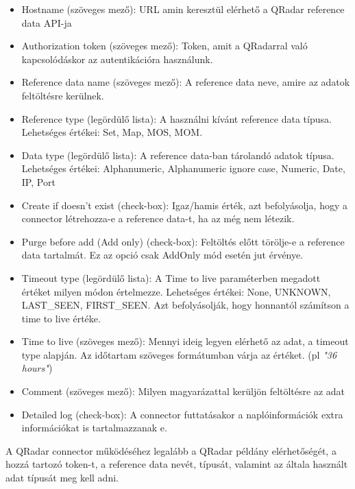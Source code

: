 \begin{itemize}
	\item Hostname (szöveges mező): URL amin keresztül elérhető a QRadar reference data API-ja 
	
	\item Authorization token (szöveges mező): Token, amit a QRadarral való kapcsolódáskor az autentikációra használunk.
	
	\item Reference data name (szöveges mező): A reference data neve, amire az adatok feltöltésre kerülnek.
	
	\item Reference type (legördülő lista): A használni kívánt reference data típusa. Lehetséges értékei: Set, Map, MOS, MOM.
	
	\item Data type (legördülő lista): A reference data-ban tárolandó adatok típusa. Lehetséges értékei: Alphanumeric, Alphanumeric ignore case, Numeric, Date, IP, Port
	
	\item Create if doesn't exist (check-box): Igaz/hamis érték, azt befolyásolja, hogy a connector létrehozza-e a reference data-t, ha az még nem létezik.
	
	\item Purge before add (Add only) (check-box): Feltöltés előtt törölje-e a reference data tartalmát. Ez az opció csak AddOnly mód esetén jut érvénye.
	
	\item Timeout type (legördülő lista): A Time to live paraméterben megadott értéket milyen módon értelmezze. Lehetséges értékei: None, UNKNOWN, LAST\_SEEN, FIRST\_SEEN. Azt befolyásolják, hogy honnantól számítson a time to live értéke.
	
	\item Time to live (szöveges mező): Mennyi ideig legyen elérhető az adat, a timeout type alapján. Az időtartam szöveges formátumban várja az értéket. (pl \textit{"36 hours"})
	
	\item Comment (szöveges mező): Milyen magyarázattal kerüljön feltöltésre az adat
	
	\item Detailed log (check-box): A connector futtatásakor a naplóinformációk extra információkat is tartalmazzanak e.
	
\end{itemize} 
A QRadar connector működéséhez legalább a QRadar példány elérhetőségét, a hozzá tartozó token-t, a reference data nevét, típusát, valamint az általa használt adat típusát meg kell adni.

